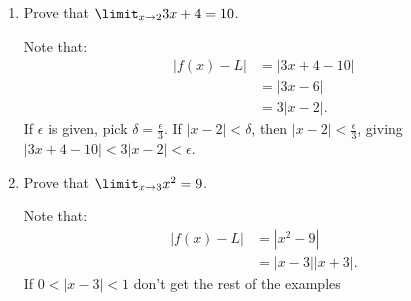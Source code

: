     \begin{example}
        \phantom{a}
        \begin{enumerate}[label = (\arabic*)]
            \item Prove that $\limit_{x \rightarrow 2}3x + 4 = 10$.
                \begin{solution}
                    Note that:
                        \begin{equation*}
                        \begin{split}
                            |f(x) - L| &= |3x+4-10| \\
                            & = |3x-6| \\
                            & = 3|x-2|.
                        \end{split}
                        \end{equation*}
                    If $\epsilon$ is given, pick $\delta = \frac{\epsilon}{3}$. If $|x - 2| < \delta$, then $|x-2| < \frac{\epsilon}{3}$, giving $|3x+4 - 10| < 3|x-2| < \epsilon$.
                \end{solution}

            \item Prove that $\limit_{x \rightarrow 3}x^2 = 9$.
                \begin{solution}
                    Note that:
                        \begin{equation*}
                        \begin{split}
                            |f(x)-L| &= |x^2 - 9| \\
                            & = |x-3||x+3|.
                        \end{split}
                        \end{equation*}
                    If $0 < |x-3| < 1$ {\color{red} don't get the rest of the examples}
                \end{solution}
        \end{enumerate}
    \end{example}

